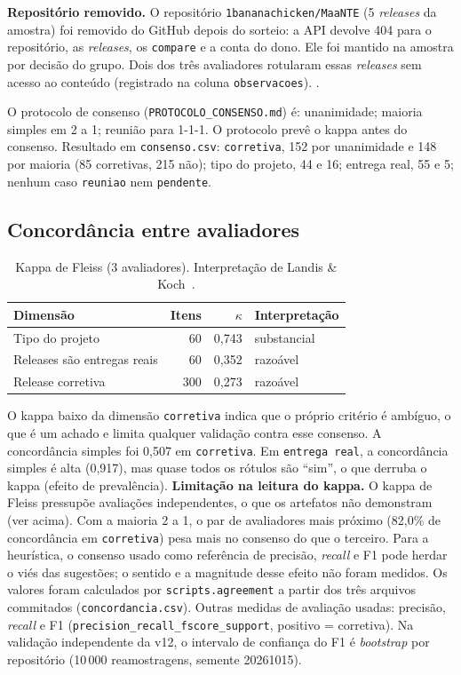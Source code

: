 \textbf{Repositório removido.} O repositório \texttt{1bananachicken/MaaNTE} (5 \textit{releases} da
amostra) foi removido do GitHub depois do sorteio: a API devolve 404 para o repositório, as
\textit{releases}, os \texttt{compare} e a conta do dono. Ele foi mantido na amostra por decisão do grupo.
Dois dos três avaliadores rotularam essas \textit{releases} sem acesso ao conteúdo (registrado na coluna
\texttt{observacoes}).
.

O protocolo de consenso (\texttt{PROTOCOLO\_CONSENSO.md}) é: unanimidade; maioria simples em 2 a 1;
reunião para 1-1-1. O protocolo prevê o kappa antes do consenso. Resultado em \texttt{consenso.csv}:
\texttt{corretiva}, 152 por unanimidade e 148 por maioria (85 corretivas, 215 não); tipo do projeto, 44 e
16; entrega real, 55 e 5; nenhum caso \texttt{reuniao} nem \texttt{pendente}.

\subsection{Concordância entre avaliadores}
\begin{table}[ht]
\centering
\caption{Kappa de Fleiss (3 avaliadores). Interpretação de Landis \& Koch~\cite{landis1977kappa}.}
\begin{tabular}{lrrl}
\hline
Dimensão & Itens & $\kappa$ & Interpretação \\ \hline
Tipo do projeto & 60 & 0,743 & substancial \\
Releases são entregas reais & 60 & 0,352 & razoável \\
Release corretiva & 300 & 0,273 & razoável \\ \hline
\end{tabular}
\end{table}
O kappa baixo da dimensão \texttt{corretiva} indica que o próprio critério é ambíguo, o que é um achado e
limita qualquer validação contra esse consenso. A concordância simples foi 0,507 em \texttt{corretiva}.
Em \texttt{entrega real}, a concordância simples é alta (0,917), mas quase todos os rótulos são ``sim'',
o que derruba o kappa (efeito de prevalência).
\textbf{Limitação na leitura do kappa.} O kappa de Fleiss pressupõe avaliações independentes, o que os
artefatos não demonstram (ver acima). Com a maioria 2 a 1, o par de avaliadores mais próximo (82,0\% de
concordância em \texttt{corretiva}) pesa mais no consenso do que o terceiro. Para a heurística, o consenso
usado como referência de precisão, \textit{recall} e F1 pode herdar o viés das sugestões; o sentido e a
magnitude desse efeito não foram medidos. Os valores foram calculados por \texttt{scripts.agreement} a
partir dos três arquivos commitados (\texttt{concordancia.csv}).
Outras medidas de avaliação usadas: precisão, \textit{recall} e F1 (\texttt{precision\_recall\_fscore\_support},
positivo = corretiva). Na validação independente da v12, o intervalo de confiança do F1 é
\textit{bootstrap} por repositório (10\,000 reamostragens, semente 20261015).

